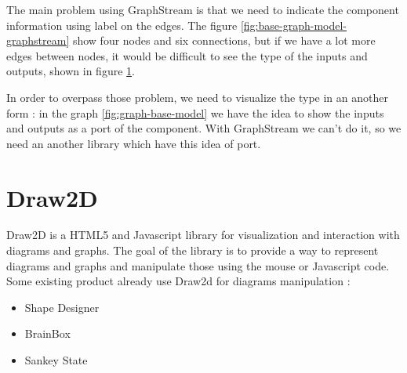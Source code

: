 The main problem using GraphStream is that we need to indicate the component
information using label on the edges. The figure
\ref{fig:base-graph-model-graphstream} show four nodes and six connections, but
if we have a lot more edges between nodes, it would be difficult to see the
type of the inputs and outputs, shown in figure
\ref{fig:graphstream-lot-of-edges}.

\begin{figure}[H]
  \centering
  \caption[Label on multiple edges using GraphStream]{}
  \label{fig:graphstream-lot-of-edges}
\end{figure}

In order to overpass those problem, we need to visualize the type in an another
form : in the graph \ref{fig:graph-base-model} we have the idea to show the
inputs and outputs as a port of the component. With GraphStream we can't do
it, so we need an another library which have this idea of port.

\section{Draw2D}
\label{sec:Draw2D}

Draw2D is a HTML5 and Javascript library for visualization and interaction with
diagrams and graphs\cite{draw2d}. The goal of the library is to provide a way to
represent diagrams and graphs and manipulate those using the mouse or Javascript
code. Some existing product already use Draw2d for diagrams manipulation :

\begin{itemize}
\item Shape Designer\cite{draw2d}
\item BrainBox\cite{draw2d}
\item Sankey State\cite{draw2d}
\end{itemize}

